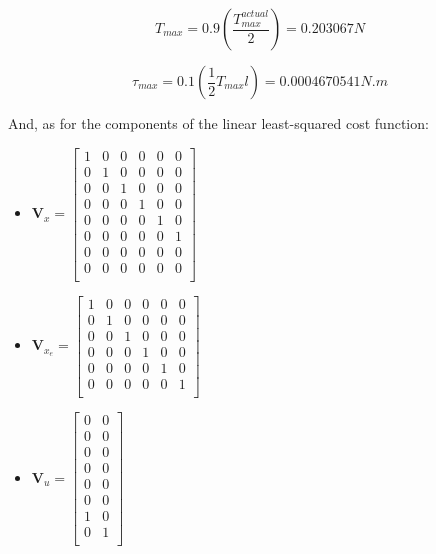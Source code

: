\documentclass{thesisreport}
\begin{document}
	\begin{equation}
		T_{max} = 0.9 (\frac{T_{max}^{actual}}{2})=0.203067N
	\end{equation}
	
	\begin{equation}
		\tau_{max} = 0.1(\frac{1}{2}T_{max}l)=0.0004670541N.m
	\end{equation}

And, as for the components of the linear least-squared cost function:

\begin{multicols}{2}
        \begin{itemize}
                \item $\bm{V}_x = \begin{bmatrix}
                1 & 0 & 0 & 0 & 0 & 0 \\
                0 & 1 & 0 & 0 & 0 & 0 \\
                0 & 0 & 1 & 0 & 0 & 0 \\
                0 & 0 & 0 & 1 & 0 & 0 \\
                0 & 0 & 0 & 0 & 1 & 0 \\
                0 & 0 & 0 & 0 & 0 & 1 \\
                0 & 0 & 0 & 0 & 0 & 0 \\
                0 & 0 & 0 & 0 & 0 & 0 \\
                \end{bmatrix}$
                
                \item $\bm{V}_{x_e} = \begin{bmatrix}
                1 & 0 & 0 & 0 & 0 & 0 \\
                0 & 1 & 0 & 0 & 0 & 0 \\
                0 & 0 & 1 & 0 & 0 & 0 \\
                0 & 0 & 0 & 1 & 0 & 0 \\
                0 & 0 & 0 & 0 & 1 & 0 \\
                0 & 0 & 0 & 0 & 0 & 1 \\
                \end{bmatrix}$
                
                \item $\bm{V}_u = \begin{bmatrix}
                0 & 0 \\
                0 & 0 \\
                0 & 0 \\
                0 & 0 \\
                0 & 0 \\
                0 & 0 \\
                1 & 0 \\
                0 & 1 \\
                \end{bmatrix}$
                

\end{itemize}
\end{multicols}
\end{document}
